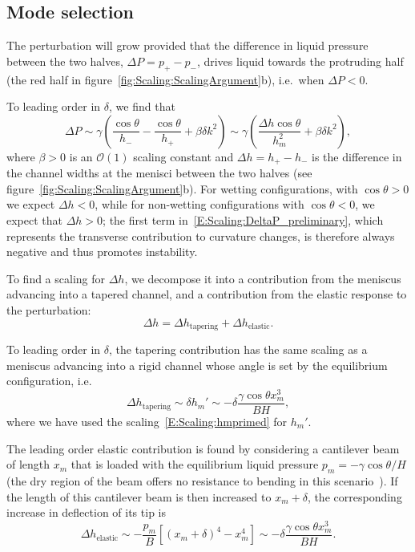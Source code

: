 \documentclass{jfm}
\newcommand{\amplitude}{\delta} %
\begin{document}
\subsection{Mode selection}
The perturbation will grow provided that the difference in liquid pressure between the two halves, $\Delta P = p_+ - p_-$, drives liquid towards the protruding half (the red half in figure~\ref{fig:Scaling:ScalingArgument}b), i.e.~when $\Delta P<0$.

To leading order in $\amplitude$, we find that
\begin{equation}\label{E:Scaling:DeltaP_preliminary}
\Delta P\sim \gamma\left(\frac{\cos \theta}{h_-} - \frac{ \cos \theta}{h_+} + \beta \amplitude k^2\right) \sim \gamma \left(\frac{\Delta h \cos \theta}{h_m^2} + \beta \amplitude k^2\right),
\end{equation}
where $\beta>0$ is an $\mathcal{O}(1)$ scaling constant and $\Delta h = h_+ - h_- $ is the difference in the channel widths at the menisci between the two halves (see figure~\ref{fig:Scaling:ScalingArgument}b). For wetting configurations, with $\cos \theta > 0$ we expect $\Delta h < 0$, while for non-wetting configurations with $\cos \theta < 0$, we expect that $\Delta h > 0$; the first term in~\eqref{E:Scaling:DeltaP_preliminary}, which represents the transverse contribution to curvature changes, is therefore always negative and thus promotes instability.

To find a scaling for $\Delta h$, we decompose it into a contribution from the meniscus advancing into a tapered channel, and a contribution from the elastic response to the perturbation:
\begin{equation}\label{E:Scaling:ChangeInH}
\Delta h = \Delta h_\text{tapering} + \Delta h_\text{elastic}.
\end{equation}

To leading order in $\amplitude$, the tapering contribution has the same scaling as a meniscus advancing into a rigid channel whose angle is set by the equilibrium configuration, i.e.
\begin{equation}\label{E:ChangeInHtapering}
\Delta h_\text{tapering} \sim \amplitude h_m' \sim -\delta \frac{\gamma  \cos \theta x_m^3}{B H},
\end{equation}
where we have used the scaling~\eqref{E:Scaling:hmprimed} for $h_m'$.

The leading order elastic contribution is found by considering a cantilever beam of length $x_m$ that is loaded with the equilibrium liquid pressure $p_m = -\gamma \cos \theta/H$ (the dry region of the beam offers no resistance to bending in this scenario~\citep{Bradley2019PRL}). If the length of this cantilever beam is then increased to $x_m + \delta$, the corresponding increase in deflection of its tip is
\begin{equation}\label{E:Scaling:ChangeInHelastic}
\Delta h_\text{elastic} \sim -\frac{p_m}{B}\left[ \left(x_m + \amplitude\right)^4 - x_m^4\right] \sim  -\amplitude \frac{\gamma \cos \theta x_m^3}{BH}.
\end{equation}
\end{document}
